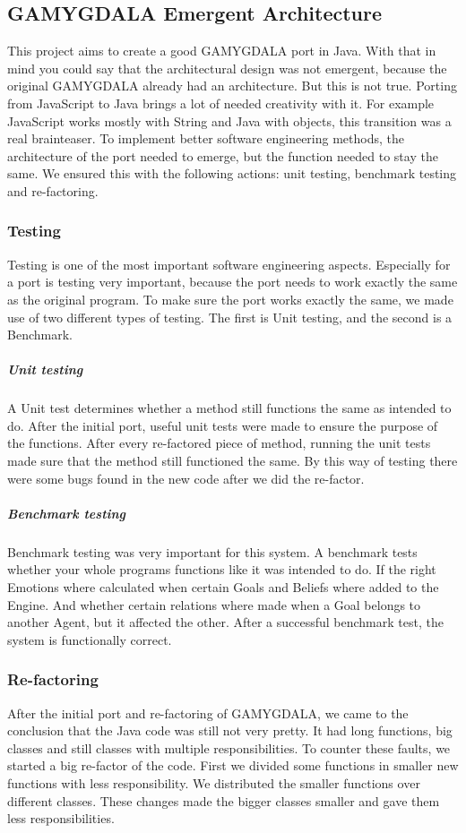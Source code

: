 \subsection{GAMYGDALA Emergent Architecture}
This project aims to create a good GAMYGDALA port in Java. With that in mind you could say that the architectural design was not emergent, because the original GAMYGDALA already had an architecture. But this is not true. Porting from JavaScript to Java brings a lot of needed creativity with it. For example JavaScript works mostly with String and Java with objects, this transition was a real brainteaser. To implement better software engineering methods, the architecture of the port needed to emerge, but the function needed to stay the same. We ensured this with the following actions: unit testing, benchmark testing and re-factoring. 

\subsubsection{Testing}
Testing is one of the most important software engineering aspects. Especially for a port is testing very important, because the port needs to work exactly the same as the original program. To make sure the port works exactly the same, we made use of two different types of testing. The first is Unit testing, and the second is a Benchmark.

	\subparagraph{Unit testing}
A Unit test determines whether a method still functions the same as intended to do. After the initial port, useful unit tests were made to ensure the purpose of the functions. After every re-factored piece of method, running the unit tests made sure that the method still functioned the same. By this way of testing there were some bugs found in the new code after we did the re-factor.

	\subparagraph{Benchmark testing}
Benchmark testing was very important for this system. A benchmark tests whether your whole programs functions like it was intended to do. If the right Emotions where calculated when certain Goals and Beliefs where added to the Engine. And whether certain relations where made when a Goal belongs to another Agent, but it affected the other. After a successful benchmark test, the system is functionally correct. 

\subsubsection{Re-factoring}
After the initial port and re-factoring of GAMYGDALA, we came to the conclusion that the Java code was still not very pretty. It had long functions, big classes and still classes with multiple responsibilities. To counter these faults, we started a big re-factor of the code. First we divided some functions in smaller new functions with less responsibility. We distributed the smaller functions over different classes. These changes made the bigger classes smaller and gave them less responsibilities.  

